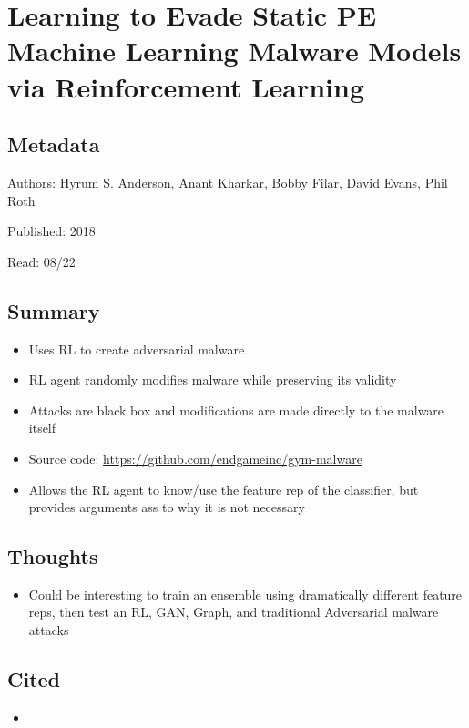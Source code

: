 \documentclass{article}
\begin{document}

\section*{Learning to Evade Static PE Machine Learning Malware Models via Reinforcement Learning}

\subsection*{Metadata}

\noindent Authors: Hyrum S. Anderson, Anant Kharkar, Bobby Filar, David Evans, Phil Roth

\noindent Published: 2018

\noindent Read: 08/22

\subsection*{Summary}
\begin{itemize}
	\item Uses RL to create adversarial malware
	\item RL agent randomly modifies malware while preserving its validity
	\item Attacks are black box and modifications are made directly to the malware itself
	\item Source code: \url{https://github.com/endgameinc/gym-malware}
	\item Allows the RL agent to know/use the feature rep of the classifier, but provides arguments ass to why it is not necessary
\end{itemize}

\subsection*{Thoughts}
\begin{itemize}
	\item Could be interesting to train an ensemble using dramatically different feature reps, then test an RL, GAN, Graph, and traditional Adversarial malware attacks
\end{itemize}

\subsection*{Cited}
\begin{itemize}
	\item 
\end{itemize}
\end{document}
